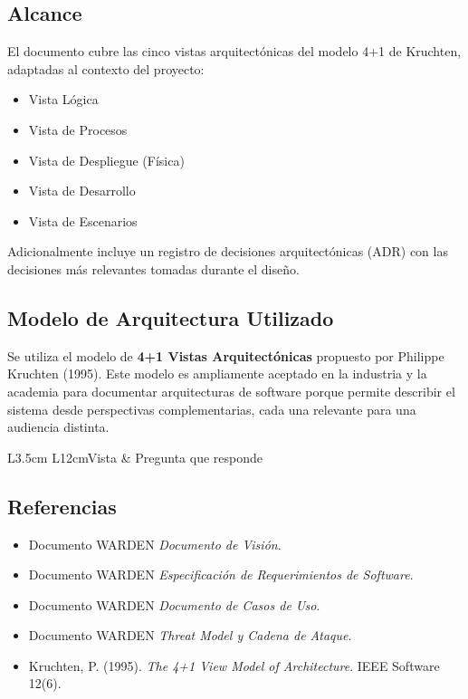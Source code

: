 \documentclass[11pt,a4paper]{article}
\begin{document}
\subsection{Alcance}
El documento cubre las cinco vistas arquitectónicas del modelo 4+1 de
Kruchten, adaptadas al contexto del proyecto:

\begin{itemize}
  \item Vista Lógica
  \item Vista de Procesos
  \item Vista de Despliegue (Física)
  \item Vista de Desarrollo
  \item Vista de Escenarios
\end{itemize}

Adicionalmente incluye un registro de decisiones arquitectónicas (ADR)
con las decisiones más relevantes tomadas durante el diseño.

\subsection{Modelo de Arquitectura Utilizado}
Se utiliza el modelo de \textbf{4+1 Vistas Arquitectónicas} propuesto por
Philippe Kruchten (1995). Este modelo es ampliamente aceptado en la
industria y la academia para documentar arquitecturas de software porque
permite describir el sistema desde perspectivas complementarias, cada una
relevante para una audiencia distinta.

\begin{datatable}{L{3.5cm} L{12cm}}{Vista & Pregunta que responde}
\end{datatable}

\subsection{Referencias}
\begin{itemize}
  \item Documento WARDEN \emph{Documento de Visión}.
  \item Documento WARDEN \emph{Especificación de Requerimientos de Software}.
  \item Documento WARDEN \emph{Documento de Casos de Uso}.
  \item Documento WARDEN \emph{Threat Model y Cadena de Ataque}.
  \item Kruchten, P. (1995). \emph{The 4+1 View Model of Architecture}.
    IEEE Software 12(6).
\end{itemize}
\end{document}

